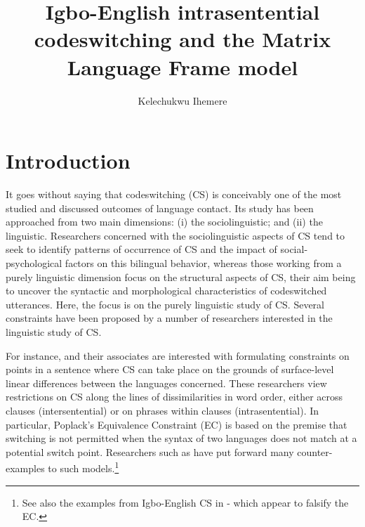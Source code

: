 \documentclass[output=paper]{langsci/langscibook}
\title{Igbo-English intrasentential codeswitching and the Matrix Language Frame model}
\author{%
 Kelechukwu Ihemere \affiliation{University of Westminster, London UK}
}
\begin{document}



 


\section{Introduction}

It goes without saying that codeswitching (CS) is conceivably one of the most studied and discussed outcomes of language contact. Its study has been approached from two main dimensions: (i) the sociolinguistic; and (ii) the linguistic. Researchers concerned with the sociolinguistic aspects of CS tend to seek to identify patterns of occurrence of CS and the impact of social-psychological factors on this bilingual behavior, whereas those working from a purely linguistic dimension focus on the structural aspects of CS, their aim being to uncover the syntactic and morphological characteristics of codeswitched utterances. Here, the focus is on the purely linguistic study of CS. Several constraints have been proposed by a number of researchers interested in the linguistic study of CS.  

For instance, \citet{PoplackMeechan1998} and their associates are interested with formulating constraints on points in a sentence where CS can take place on the grounds of surface-level linear differences between the languages concerned. These researchers view restrictions on CS along the lines of dissimilarities in word order, either across clauses (intersentential) or on phrases within clauses (intrasentential). In particular, Poplack’s Equivalence Constraint (EC) is based on the premise that switching is not permitted when the syntax of two languages does not match at a potential switch point. Researchers such as \citet{Bhatt2001} have put forward many counter-examples to such models.\footnote{See also the examples from Igbo-English CS in - which appear to falsify the EC.} 
\end{document}

